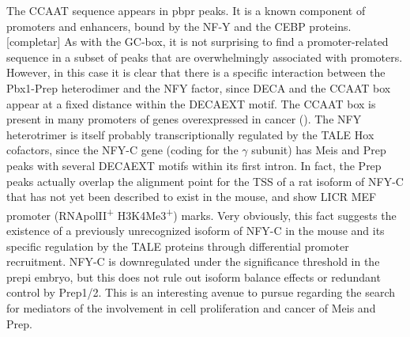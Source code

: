 The CCAAT sequence appears in \ac{pbpr} peaks. It is a known component of promoters and enhancers, bound by the NF-Y and the CEBP proteins. [completar] As with the GC-box, it is not surprising to find a promoter-related sequence in a subset of peaks that are overwhelmingly associated with promoters. However, in this case it is clear that there is a specific interaction between the Pbx1-Prep heterodimer and the NFY factor, since \ac{DECA} and the CCAAT box appear at a fixed distance within the \ac{DECAEXT} motif. The CCAAT box is present in many promoters of genes overexpressed in cancer (\cite{Dolfini2013}). The NFY heterotrimer is itself probably transcriptionally regulated by the \ac{TALE} Hox cofactors, since the NFY-C gene (coding for the $\gamma$ subunit) has Meis and Prep peaks with several \ac{DECAEXT} motifs within its first intron. In fact, the Prep peaks actually overlap the alignment point for the \ac{TSS} of a rat isoform of NFY-C that has not yet been described to exist in the mouse, and show LICR \ac{MEF} promoter (RNApolII\textsuperscript{+} H3K4Me3\textsuperscript{+}) marks. Very obviously, this fact suggests the existence of a previously unrecognized isoform of NFY-C in the mouse and its specific regulation by the \ac{TALE} proteins through differential promoter recruitment. NFY-C is downregulated under the significance threshold in the \ac{prepi} embryo, but this does not rule out isoform balance effects or redundant control by Prep1/2. This is an interesting avenue to pursue regarding the search for mediators of the involvement in cell proliferation and cancer of Meis and Prep.


 

